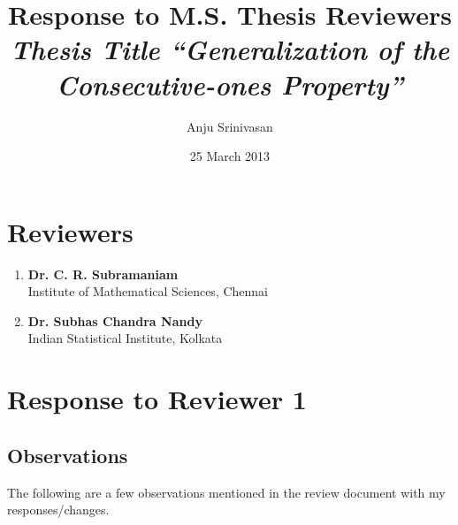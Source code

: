 \documentclass{article}
\begin{document}
\title{Response to M.S. Thesis Reviewers\\ 
 {\em Thesis Title ``Generalization of the Consecutive-ones Property''}}
\author{Anju Srinivasan}
\date{25 March 2013}

\maketitle


\section{Reviewers}

\begin{enumerate}
\item  {\bf Dr. C. R. Subramaniam}\\ Institute of Mathematical Sciences, Chennai
\item  {\bf Dr. Subhas Chandra Nandy}\\ Indian Statistical Institute, Kolkata
\end{enumerate}

\section{Response to Reviewer 1}

\subsection{Observations}
The following are a few observations mentioned in the review document
with my responses/changes.
\end{document}
